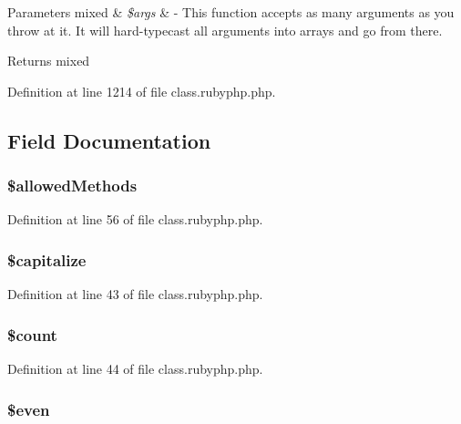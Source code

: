 \begin{DoxyParams}[1]{Parameters}
mixed & {\em \$args} & -\/ This function accepts as many arguments as you throw at it. It will hard-\/typecast all arguments into arrays and go from there. \\
\hline
\end{DoxyParams}
\begin{DoxyReturn}{Returns}
mixed 
\end{DoxyReturn}


Definition at line 1214 of file class.\-rubyphp.\-php.



\subsection{Field Documentation}
\hypertarget{classr_ab278eba7cab5341dacdccecd7a2cc2df}{
\subsubsection[{\$allowed\-Methods}]{\setlength{\rightskip}{0pt plus 5cm}\$allowed\-Methods}}\label{classr_ab278eba7cab5341dacdccecd7a2cc2df}


Definition at line 56 of file class.\-rubyphp.\-php.

\hypertarget{classr_a41c83fecb936997f3e2dae40207e31dd}{
\subsubsection[{\$capitalize}]{\setlength{\rightskip}{0pt plus 5cm}\$capitalize}}\label{classr_a41c83fecb936997f3e2dae40207e31dd}


Definition at line 43 of file class.\-rubyphp.\-php.

\hypertarget{classr_af789423037bbc89dc7c850e761177570}{
\subsubsection[{\$count}]{\setlength{\rightskip}{0pt plus 5cm}\$count}}\label{classr_af789423037bbc89dc7c850e761177570}


Definition at line 44 of file class.\-rubyphp.\-php.

\hypertarget{classr_ab661cd196618c18d23108b83a10728f3}{
\subsubsection[{\$even}]{\setlength{\rightskip}{0pt plus 5cm}\${\bf even}}}\label{classr_ab661cd196618c18d23108b83a10728f3}


